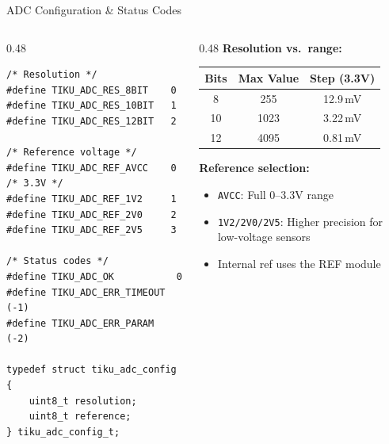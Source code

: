 \documentclass[aspectratio=169, 10pt]{beamer}
\begin{document}
\begin{frame}[fragile]{ADC Configuration \& Status Codes}
\begin{columns}[T]
\begin{column}{0.48\textwidth}
\begin{lstlisting}[style=cstyle,
  title={interfaces/adc/tiku\_adc.h}]
/* Resolution */
#define TIKU_ADC_RES_8BIT    0
#define TIKU_ADC_RES_10BIT   1
#define TIKU_ADC_RES_12BIT   2

/* Reference voltage */
#define TIKU_ADC_REF_AVCC    0  /* 3.3V */
#define TIKU_ADC_REF_1V2     1
#define TIKU_ADC_REF_2V0     2
#define TIKU_ADC_REF_2V5     3

/* Status codes */
#define TIKU_ADC_OK           0
#define TIKU_ADC_ERR_TIMEOUT (-1)
#define TIKU_ADC_ERR_PARAM   (-2)

typedef struct tiku_adc_config {
    uint8_t resolution;
    uint8_t reference;
} tiku_adc_config_t;
\end{lstlisting}
\end{column}

\begin{column}{0.48\textwidth}
\textbf{Resolution vs.\ range:}
\begin{table}
\centering
\scriptsize
\begin{tabular}{@{}ccc@{}}
\toprule
\textbf{Bits} & \textbf{Max Value} & \textbf{Step (3.3V)} \\
\midrule
8  & 255   & 12.9\,mV \\
10 & 1023  & 3.22\,mV \\
12 & 4095  & 0.81\,mV \\
\bottomrule
\end{tabular}
\end{table}

\vspace{0.5em}
\textbf{Reference selection:}
\begin{itemize}
  \item \texttt{AVCC}: Full 0--3.3V range
  \item \texttt{1V2/2V0/2V5}: Higher precision
        for low-voltage sensors
  \item Internal ref uses the REF module
\end{itemize}
\end{column}
\end{columns}
\end{frame}
\end{document}
